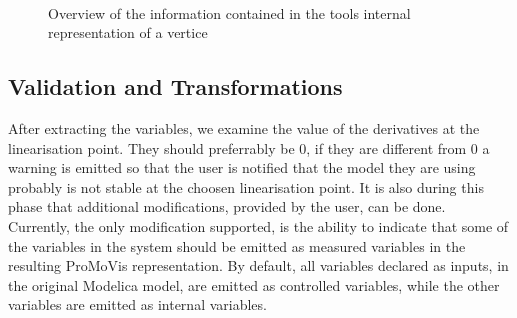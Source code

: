 %
\begin{figure}
\\\newline 
\caption{Overview of the information contained in the tools internal representation of a vertice}
\label{fig:internalrep}
\end{figure}
%
\subsection{Validation and Transformations}
After extracting the variables, we examine the value of the derivatives at the linearisation point. They should preferrably be 0, if they are different from 0 a warning is emitted so that the user is notified that the model they are using probably is not stable at the choosen linearisation point. It is also during this phase that additional modifications, provided by the user, can be done. Currently, the only modification supported, is the ability to indicate that some of the variables in the system should be emitted as measured variables in the resulting ProMoVis representation. By default, all variables declared as inputs, in the original Modelica model,  are emitted as controlled variables, while the other variables are emitted as internal variables.
